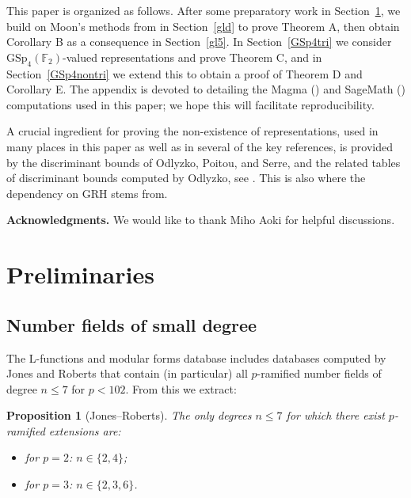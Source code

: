 \documentclass{amsart}
\newtheorem{prop}[theorem]{Proposition}
\theoremstyle{definition}
\newcommand{\F}{\mathbb{F}}
\newcommand{\GSp}{\mathrm{GSp}}
\renewcommand{\leq}{\leqslant}
\begin{document}
This paper is organized as follows.
After some preparatory work in Section~\ref{prelim}, we build on Moon's methods from \cite{Mo1,Mo2} in Section~\ref{gld} to prove Theorem A, then obtain Corollary B as a consequence in Section~\ref{gl5}.
In Section~\ref{GSp4tri} we consider $\GSp_4(\F_2)$-valued representations and prove Theorem C, and in Section~\ref{GSp4nontri} we extend this to obtain a proof of Theorem D and Corollary E.
The appendix is devoted to detailing the Magma (\cite{BCP}) and SageMath (\cite{Sage}) computations used in this paper; we hope this will facilitate reproducibility.

A crucial ingredient for proving the non-existence of representations, used in many places in this paper as well as in several of the key references, is provided by the discriminant bounds of Odlyzko, Poitou, and Serre, and the related tables of discriminant bounds computed by Odlyzko, see \cite{Od}.
This is also where the dependency on GRH stems from.

\textbf{Acknowledgments.} We would like to thank Miho Aoki for helpful discussions.


\section{Preliminaries}\label{prelim}

\subsection{Number fields of small degree}

The L-functions and modular forms database \cite{LMFDB} includes databases computed by Jones and Roberts \cite{JR} that contain (in particular) all $p$-ramified number fields of degree $n\leq 7$ for $p<102$.
From this we extract:
\begin{prop}[Jones--Roberts]\label{prop:lmfdb}
  The only degrees $n\leq 7$ for which there exist $p$-ramified extensions are:
  \begin{itemize}
    \item for $p=2$: $n\in\{2,4\}$;
    \item for $p=3$: $n\in\{2,3,6\}$.
  \end{itemize}
\end{prop}
\end{document}

